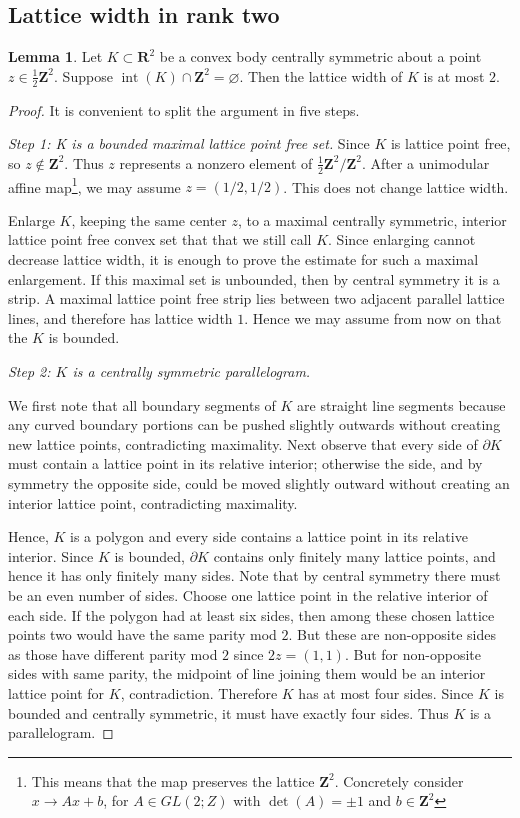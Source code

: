 \documentclass[11pt,reqno]{amsart}
\numberwithin{equation}{section}
\numberwithin{equation}{section}
\theoremstyle{definition}
\newtheorem{lemma}[theorem]{Lemma}
\newcommand{\R}{\mathbf R}
\newcommand{\Z}{\mathbf Z}
\begin{document}
\subsection{Lattice width in rank two}

\begin{lemma}\label{lem:half-lattice-width}
Let \(K\subset\R^2\) be a convex body centrally symmetric about a point \(z\in\frac12\Z^2\). Suppose \(\operatorname{int}(K)\cap\Z^2=\varnothing\). Then the lattice width of \(K\) is at most \(2\).
\end{lemma}

\begin{proof}
It is convenient to split the argument in five steps. 

\emph{Step 1: K is a bounded maximal lattice point free set.}
Since \(K\) is lattice point free, so \(z\notin\Z^2\). Thus \(z\) represents a nonzero element of \(\frac12\Z^2/\Z^2\). After a unimodular affine map\footnote{This means that the map preserves the lattice $\Z^2$. Concretely consider $x \to Ax + b$, for $A \in GL(2;Z)$ with $\det(A)= \pm 1$ and $b \in \Z^2$}, we may assume \(z=(1/2,1/2)\). This does not change lattice width.

Enlarge \(K\), keeping the same center \(z\), to a maximal centrally symmetric, interior lattice point free convex set that that we still call $K$. Since enlarging cannot decrease lattice width, it is enough to prove the estimate for such a maximal enlargement. If this maximal set is unbounded, then by central symmetry it is a strip. A maximal lattice point free strip lies between two adjacent parallel lattice lines, and therefore has lattice width \(1\). Hence we may assume from now on that the \(K\) is bounded.

\emph{Step 2: $K$ is a centrally symmetric parallelogram.}

We first note that all boundary segments of $K$ are straight line segments because any curved boundary portions can be pushed slightly outwards without creating new lattice points, contradicting maximality. Next observe that every side of $\partial K$ must contain a lattice point in its relative interior; otherwise the side, and by symmetry the opposite side, could be moved slightly outward without creating an interior lattice point, contradicting maximality. 

Hence, $K$ is a polygon and every side contains a lattice point in its relative interior. Since $K$ is bounded, $\partial K$ contains only finitely many lattice points, and hence it has only finitely many sides. Note that by central symmetry there must be an even number of sides. Choose one lattice point in the relative interior of each side. If the polygon had at least six sides, then among these chosen lattice points two would have the same parity mod \(2\). But these are non-opposite sides as those have different parity mod $2$ since $2z=(1,1)$. But for non-opposite sides with same parity, the midpoint of line joining them would be an interior lattice point for $K$, contradiction. Therefore \(K\) has at most four sides. Since \(K\) is bounded and centrally symmetric, it must have exactly four sides. Thus \(K\) is a parallelogram.


\end{proof}
\end{document}

